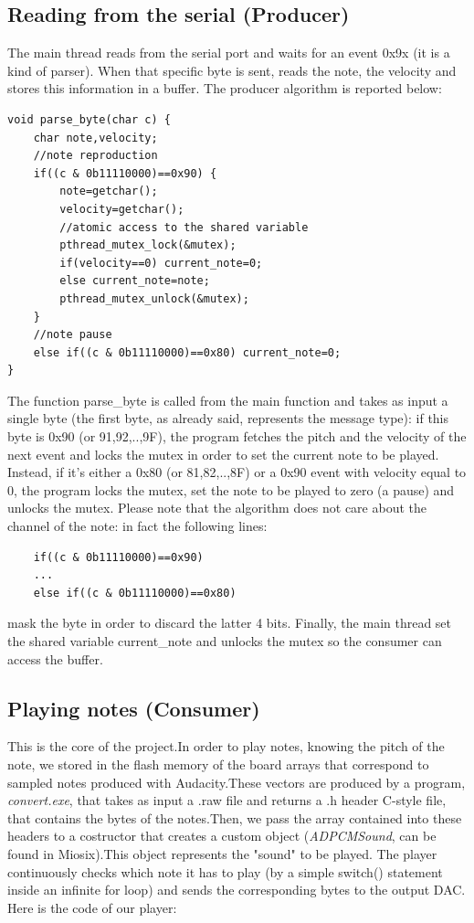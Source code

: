 \documentclass[12pt]{article}
\begin{document}
\subsection{Reading from the serial (Producer)}\label{subsec:reading}
The main thread reads from the serial port and waits for an event 0x9x (it is a kind of parser). When that specific byte is sent, reads the note, the velocity and stores this information in a buffer. The producer algorithm is reported below:
\begin{lstlisting}
void parse_byte(char c) {
	char note,velocity;
	//note reproduction
	if((c & 0b11110000)==0x90) {
		note=getchar();
		velocity=getchar();
		//atomic access to the shared variable
		pthread_mutex_lock(&mutex);
		if(velocity==0) current_note=0;
		else current_note=note;
		pthread_mutex_unlock(&mutex);
	}
	//note pause
	else if((c & 0b11110000)==0x80) current_note=0;
}
\end{lstlisting}
The function parse\_byte is called from the main function and takes as input a single byte (the first byte, as already said, represents the message type): if this byte is 0x90 (or 91,92,..,9F), the program fetches the pitch and the velocity of the next event and locks the mutex in order to set the current note to be played. Instead, if it's either a 0x80 (or 81,82,..,8F) or a 0x90 event with velocity equal to 0, the program locks the mutex, set the note to be played to zero (a pause) and unlocks the mutex. Please note that the algorithm does not care about the channel of the note: in fact the following lines:
\begin{lstlisting}
	if((c & 0b11110000)==0x90)
	...
	else if((c & 0b11110000)==0x80)
\end{lstlisting}
mask the byte in order to discard the latter 4 bits.\newline
Finally, the main thread set the shared variable current\_note and unlocks the mutex so the consumer can access the buffer.

\subsection{Playing notes (Consumer)}\label{subsec:playing}
This is the core of the project.In order to play notes, knowing the pitch of the note, we stored in the flash memory of the board arrays that correspond to sampled notes produced with Audacity.These vectors are produced by a program, \textit{convert.exe}, that takes as input a .raw file and returns a .h header C-style file, that contains the bytes of the notes.Then, we pass the array contained into these headers to a costructor that creates a custom object (\textit{ADPCMSound}, can be found in Miosix).This object represents the "sound" to be played.\newline
The player continuously checks which note it has to play (by a simple switch() statement inside an infinite for loop) and sends the corresponding bytes to the output DAC. Here is the code of our player:\newpage
\end{document}
